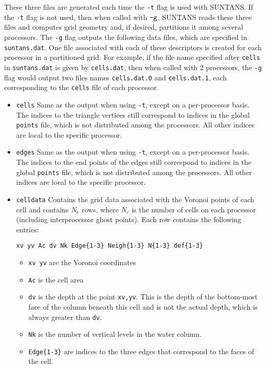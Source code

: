 These three files are generated each time the \verb+-t+ flag is used with SUNTANS.  If
the \verb+-t+ flag is not used, then when called with $\verb+-g+$, SUNTANS reads these
three files and computes grid geometry and, if desired, partitions it among several processors.
The \verb+-g+ flag outputs the following data files, which are specified in \verb+suntans.dat+.
One file associated with each of these descriptors is created for each processor in a partitioned
grid.  For example, if the file name specified after \verb+cells+ in \verb+suntans.dat+ is given
by \verb+cells.dat+, then when called with 2 processors, the \verb+-g+ flag would output two files
names \verb+cells.dat.0+ and \verb+cells.dat.1+, each corresponding to the \verb+cells+ file of
each processor.
\begin{itemize}
\item \verb+cells+ Same as the output when using \verb+-t+, except on a per-processor basis.
The indices to the triangle vertices still correspond to indices in the global \verb+points+ file, which is
not distributed among the processors.  All other indices are local to the specific processor.
\item \verb+edges+ Same as the output when using \verb+-t+, except on a per-processor basis.
The indices to the end points of the edges still correspond to indices in the global \verb+points+ file, which is
not distributed among the processors.  All other indices are local to the specific processor.
\item \verb+celldata+ Contains the grid data associated with the Voronoi points of each cell and contains
$N_c$ rows, where $N_c$ is the number of cells on each processor (including interprocessor ghost points).
Each row contains the following entries:
\begin{verbatim}
xv yv Ac dv Nk Edge{1-3} Neigh{1-3} N{1-3} def{1-3}
\end{verbatim}
\begin{itemize}
\item \verb+xv yv+ are the Voronoi coordinates
\item \verb+Ac+ is the cell area
\item \verb+dv+ is the depth at the point \verb+xv,yv+.  This is the depth of the bottom-most
face of the column beneath this cell and is not the actual depth, which is always greater than
\verb+dv+.
\item \verb+Nk+ is the number of vertical levels in the water column.
\item \verb+Edge{1-3}+ are indices to the three edges that correspond to the faces of the cell.

\end{itemize}
\end{itemize}
